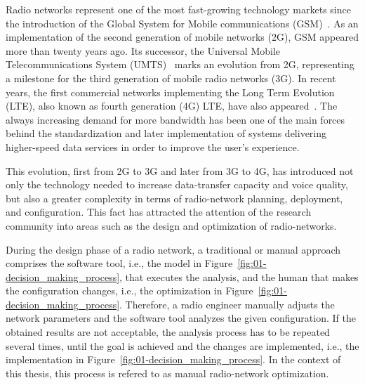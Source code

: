 Radio networks represent one of the most fast-growing technology markets
since the introduction of the Global System for Mobile communications
(GSM)~\cite{3GPP_TR_50.099}.
As an implementation of the second generation of mobile networks (2G),
GSM appeared more than twenty years ago. Its successor, the Universal
Mobile Telecommunications System (UMTS)~\cite{3GPP_TR_23.101}
marks an evolution from 2G, representing a milestone for the third
generation of mobile radio networks (3G).
In recent years, the first commercial networks implementing the Long
Term Evolution (LTE),
also known as fourth generation (4G)
LTE, have also appeared~\cite{Gerstenberger-Introduction_to_LTE:2011}.
The always increasing demand for more bandwidth has been one of the
main forces behind the standardization and later implementation of
systems delivering higher-speed data services in order to improve
the user's experience.

This evolution, first from 2G to 3G and later from 3G to 4G, has introduced
not only the technology needed to increase data-transfer capacity
and voice quality, but also a greater complexity in terms of radio-network
planning, deployment, and configuration. This fact has attracted the
attention of the research community into areas such as the design
and optimization of radio-networks.

During the design phase of a radio network, a traditional or manual
approach comprises the software tool, i.e., the model in Figure~\ref{fig:01-decision_making_process},
that executes the analysis, and the human that makes the configuration
changes, i.e., the optimization in Figure~\ref{fig:01-decision_making_process}.
Therefore, a radio engineer manually adjusts the network parameters
and the software tool analyzes the given configuration. If the obtained
results are not acceptable, the analysis process has to be repeated
several times, until the goal is achieved and the changes are implemented,
i.e., the implementation in Figure~\ref{fig:01-decision_making_process}.
In the context of this thesis, this process is refered to as manual
radio-network optimization. 

